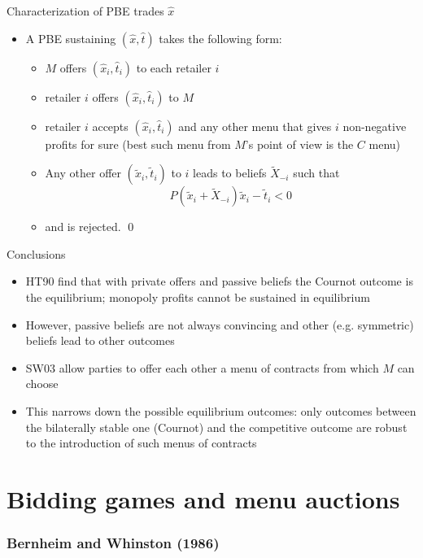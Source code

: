 \documentclass[11pt,english]{beamer}
\begin{document}
\begin{frame}[allowframebreaks]{Characterization of PBE trades $\hat{x}$}
\begin{itemize}
    \item A PBE sustaining $(\hat{x},\hat{t})$ takes the following form:
      \begin{itemize}
      \item $M$ offers $(\hat{x}_i,\hat{t}_i)$ to each retailer $i$
      \item retailer $i$ offers $(\hat{x}_i,\hat{t}_i)$ to $M$
      \item retailer $i$ accepts $(\hat{x}_i,\hat{t}_i)$ and any other
        menu that gives $i$ non-negative profits for sure (best such
        menu from $M$'s point of view is the $C$ menu)
      \item Any other offer $(\tilde{x}_i,\tilde{t}_i)$ to $i$ leads
        to beliefs $\tilde{X}_{-i}$ such that
        \begin{equation*}
          P(\tilde{x}_i + \tilde{X}_{-i})\tilde{x}_i -\tilde{t}_i<0
        \end{equation*}
      \item and is rejected. \qed
    \end{itemize}
    \end{itemize}
\end{frame}

\begin{frame}{Conclusions}
  \begin{itemize}
  \item HT90 find that with private offers and passive beliefs the
    Cournot outcome is the equilibrium; monopoly profits cannot be
    sustained in equilibrium
  \item However, passive beliefs are not always convincing and other
    (e.g. symmetric) beliefs lead to other outcomes
  \item SW03 allow parties to offer each other a menu of contracts
    from which $M$ can choose
  \item This narrows down the possible equilibrium outcomes: only
    outcomes between the bilaterally stable one (Cournot) and the
    competitive outcome are robust to the introduction of such menus
    of contracts
  \end{itemize}
\end{frame}
\part[lecture 4]{Bidding games and menu auctions}

\section{Bernheim and Whinston (1986)}
\end{document}
